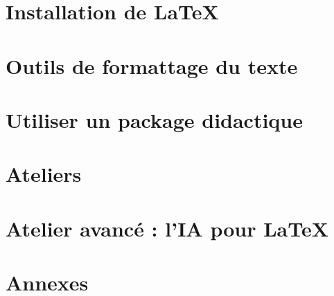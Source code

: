 \section{Installation de \LaTeX}


\newpage
\section{Outils de formattage du texte}



\newpage
\section{Utiliser un package didactique}



\newpage



\newpage
\section{Ateliers}



\newpage

\newpage


\newpage
\section{Atelier avancé : l'IA pour LaTeX}


\newpage



\newpage
\section{Annexes}

